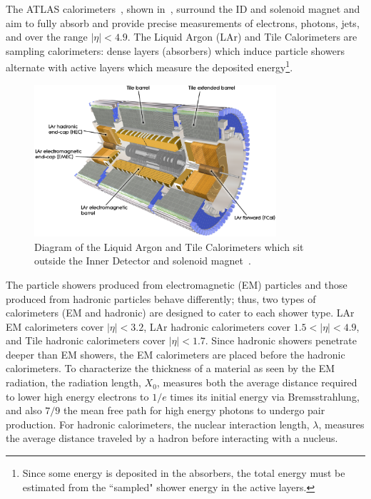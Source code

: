 The ATLAS calorimeters~\cite{LAr_TDR,Tile_TDR}, shown in~\Fig{\ref{fig:cal_layout}}, surround the ID and solenoid magnet and aim to fully absorb and provide precise measurements of electrons, photons, jets, and \MET over the range $|\eta|<4.9$. The Liquid Argon (LAr) and Tile Calorimeters are sampling calorimeters: dense layers (absorbers) which induce particle showers alternate with active layers which measure the deposited energy\footnote{
	Since some energy is deposited in the absorbers, the total energy must be estimated from the ``sampled" shower energy in the active layers.
}.

\begin{figure}[tbp]
\begin{center}
\includegraphics[width=0.8\textwidth]{figures/ATLAS/calorimeter_layout}
\caption[Layout of Liquid Argon and Tile calorimters]{Diagram of the Liquid Argon and Tile Calorimeters which sit outside the Inner Detector and solenoid magnet~\cite{ATLAS}.}
\label{fig:cal_layout}
\end{center}
\end{figure}

The particle showers produced from electromagnetic (EM) particles and those produced from hadronic particles behave differently; thus, two types of calorimeters (EM and hadronic) are designed to cater to each  shower type. LAr EM calorimeters cover $|\eta|<3.2$, LAr hadronic calorimeters cover $1.5<|\eta|<4.9$, and Tile hadronic calorimeters cover $|\eta|<1.7$. Since hadronic showers penetrate deeper than EM showers, the EM calorimeters are placed before the hadronic calorimeters. To characterize the thickness of a material as seen by the EM radiation, the radiation length, $X_0$, measures both the average distance required to lower high energy electrons to $1/e$ times its initial energy via Bremsstrahlung, and also $7/9$ the mean free path for high energy photons to undergo pair production. For hadronic calorimeters, the nuclear interaction length, $\lambda$, measures the average distance traveled by a hadron before interacting with a nucleus.

